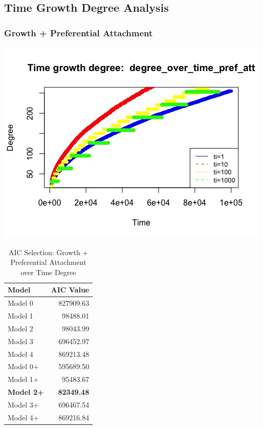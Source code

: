 \documentclass[12pt, a4paper]{article}
\begin{document}
\subsection{Time Growth Degree Analysis}

\subsubsection{Growth + Preferential Attachment}

\begin{minipage}[t]{\linewidth}
    \includegraphics[width=\textwidth]{time_growth_degree_pref_att}
    \captionsetup{type=figure}
    \label{fig:time_growth_degree_pref_att}
  \end{minipage}

\begin{table}[H]
    \centering
    \begin{tabular}{l r}
        Model & AIC Value\\
        \hline
        Model 0  &  827909.63\\
        Model 1  &  98488.01\\
        Model 2  &  98043.99\\
        Model 3  &  696452.97\\
        Model 4  &  869213.48\\
        Model 0+  &  595689.50\\
        Model 1+  &  95483.67\\
        \textbf{Model 2+} & \textbf{82349.48}\\
        Model 3+  &  696467.54\\
        Model 4+  &  869216.84\\
    \end{tabular}
    \caption{AIC Selection: Growth + Preferential Attachment over Time Degree}
    \label{table:time_grow_ran_att_1}
\end{table}
\end{document}
